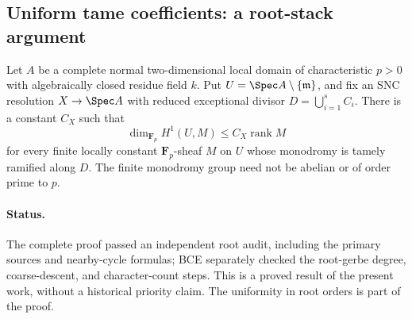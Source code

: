 \subsection{Uniform tame coefficients: a root-stack argument}

\begin{proposition}
Let $A$ be a complete normal two-dimensional local domain of
characteristic $p>0$ with algebraically closed residue field $k$.
Put $U=\Spec A\setminus\{\mathfrak m\}$, and fix an SNC resolution
$X\to\Spec A$ with reduced exceptional divisor
$D=\bigcup_{i=1}^s C_i$. There is a constant $C_X$ such that
\[
 \dim_{\mathbf F_p}H^1(U,M)\leq C_X\operatorname{rank}M
 \tag{F8.0}
\]
for every finite locally constant $\mathbf F_p$-sheaf $M$ on $U$
whose monodromy is tamely ramified along $D$.
The finite monodromy group need not be abelian or of order prime to $p$.
\end{proposition}

\paragraph{Status.}
The complete proof passed an independent root audit, including the
primary sources and nearby-cycle formulas; BCE separately checked
the root-gerbe degree, coarse-descent, and character-count steps.
This is a proved result of the present work, without a historical
priority claim. The uniformity in root orders is part of the proof.

